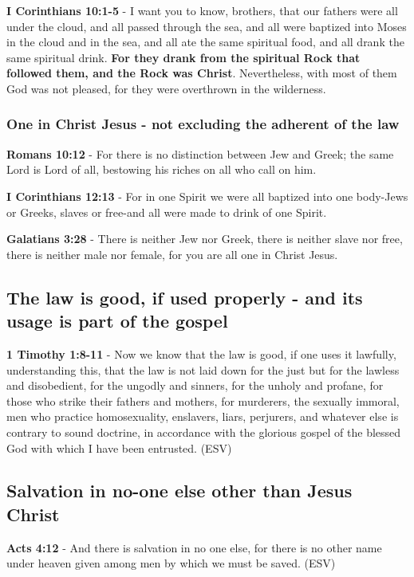 \documentclass[11pt]{article}
\begin{document}
\textbf{I Corinthians 10:1-5} - I want you to know, brothers, that our fathers were all under the cloud, and all passed through the sea, and all were baptized into Moses in the cloud and in the sea, and all ate the same spiritual food, and all drank the same spiritual drink. \textbf{For they drank from the spiritual Rock that followed them, and the Rock was Christ}.  Nevertheless, with most of them God was not pleased, for they were overthrown in the wilderness.

\subsubsection{One in Christ Jesus - not excluding the adherent of the law}
\label{sec:org1cf4db2}

\textbf{Romans 10:12} - For there is no distinction between Jew and Greek; the same Lord is Lord of all, bestowing his riches on all who call on him.

\textbf{I Corinthians 12:13} - For in one Spirit we were all baptized into one body-Jews or Greeks, slaves or free-and all were made to drink of one Spirit.

\textbf{Galatians 3:28} - There is neither Jew nor Greek, there is neither slave nor free, there is neither male nor female, for you are all one in Christ Jesus.

\subsection{The law is good, if used properly - and its usage is part of the gospel}
\label{sec:org831c283}
\textbf{1 Timothy 1:8-11} -  Now we know that the law is good, if one uses it lawfully, understanding this, that the law is not laid down for the just but for the lawless and disobedient, for the ungodly and sinners, for the unholy and profane, for those who strike their fathers and mothers, for murderers, the sexually immoral, men who practice homosexuality, enslavers, liars, perjurers, and whatever else is contrary to sound doctrine, in accordance with the glorious gospel of the blessed God with which I have been entrusted.  (ESV)

\subsection{Salvation in no-one else other than Jesus Christ}
\label{sec:orgc0c1f79}
\textbf{Acts 4:12} - And there is salvation in no one else, for there is no other name under heaven given among men by which we must be saved.  (ESV)
\end{document}
